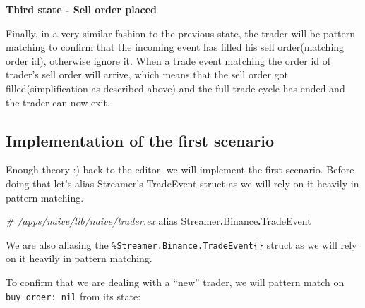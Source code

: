 \documentclass[
  oneside]{book}
\newenvironment{Shaded}{\begin{snugshade}}{\end{snugshade}}
\newcommand{\CommentTok}[1]{\textcolor[rgb]{0.56,0.35,0.01}{\textit{#1}}}
\newcommand{\ConstantTok}[1]{\textcolor[rgb]{0.56,0.35,0.01}{#1}}
\newcommand{\ImportTok}[1]{#1}
\newcommand{\OperatorTok}[1]{\textcolor[rgb]{0.81,0.36,0.00}{\textbf{#1}}}
\begin{document}
\textbf{Third state - Sell order placed}

Finally, in a very similar fashion to the previous state, the trader will be pattern matching to confirm that the incoming event has filled his sell order(matching order id), otherwise ignore it.
When a trade event matching the order id of trader's sell order will arrive, which means that the sell order got filled(simplification as described above) and the full trade cycle has ended and the trader can now exit.

\subsection{Implementation of the first scenario}\label{implementation-of-the-first-scenario}

Enough theory :) back to the editor, we will implement the first scenario. Before doing that let's alias Streamer's TradeEvent struct as we will rely on it heavily in pattern matching.

\begin{Shaded}
\begin{Highlighting}[]
  \CommentTok{\# /apps/naive/lib/naive/trader.ex}
  \ImportTok{alias} \ConstantTok{Streamer}\OperatorTok{.}\ConstantTok{Binance}\OperatorTok{.}\ConstantTok{TradeEvent}
\end{Highlighting}
\end{Shaded}

We are also aliasing the \texttt{\%Streamer.Binance.TradeEvent\{\}} struct as we will rely on it heavily in pattern matching.

To confirm that we are dealing with a ``new'' trader, we will pattern match on \texttt{buy\_order:\ nil} from its state:
\end{document}
